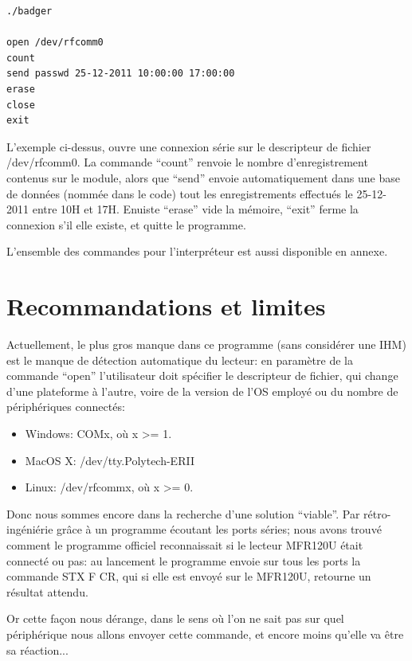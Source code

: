     \begin{lstlisting}
./badger

open /dev/rfcomm0
count
send passwd 25-12-2011 10:00:00 17:00:00
erase
close
exit
    \end{lstlisting}

L'exemple ci-dessus, ouvre une connexion série sur le descripteur de fichier
/dev/rfcomm0. La commande ``count'' renvoie le nombre d'enregistrement contenus sur 
le module, alors que ``send'' envoie automatiquement dans une base de données (nommée
dans le code) tout les enregistrements effectués le 25-12-2011 entre 10H et 17H.
Enuiste ``erase'' vide la mémoire, ``exit'' ferme la connexion s'il elle existe, et
quitte le programme.

L'ensemble des commandes pour l'interpréteur est aussi disponible en annexe.


    \section{Recommandations et limites}
Actuellement, le plus gros manque dans ce programme (sans considérer une IHM) est
le manque de détection automatique du lecteur: en paramètre de la commande ``open''
l'utilisateur doit spécifier le descripteur de fichier, qui change d'une plateforme
à l'autre, voire de la version de l'OS employé ou du nombre de périphériques connectés:

    \begin{itemize}
    \item Windows: COMx, où x >= 1.
    \item MacOS X: /dev/tty.Polytech-ERII
    \item Linux: /dev/rfcommx, où x >= 0.
    \end{itemize}

Donc nous sommes encore dans la recherche d'une solution ``viable''. Par
rétro-ingéniérie grâce à un programme écoutant les ports séries; nous avons
trouvé comment le programme officiel reconnaissait si le lecteur MFR120U était 
connecté ou pas: au lancement le programme envoie sur tous les ports la commande
STX F CR, qui si elle est envoyé sur le MFR120U, retourne un résultat attendu.

Or cette façon nous dérange, dans le sens où l'on ne sait pas sur quel périphérique
nous allons envoyer cette commande, et encore moins qu'elle va être sa réaction...
